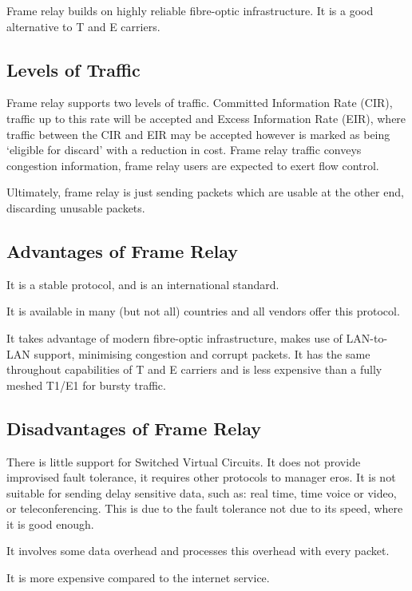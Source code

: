 Frame relay builds on highly reliable fibre-optic infrastructure. It is a good alternative to T and E carriers.
\subsection*{Levels of Traffic}
Frame relay supports two levels of traffic. Committed Information Rate (CIR), traffic up to this rate will be accepted and Excess Information Rate (EIR), where traffic between the CIR and EIR may be accepted however is marked as being `eligible for discard' with a reduction in cost. Frame relay traffic conveys congestion information, frame relay users are expected to exert flow control.

Ultimately, frame relay is just sending packets which are usable at the other end, discarding unusable packets.
\subsection*{Advantages of Frame Relay}
It is a stable protocol, and is an international standard.

It is available in many (but not all) countries and all vendors offer this protocol.

It takes advantage of modern fibre-optic infrastructure, makes use of LAN-to-LAN support, minimising congestion and corrupt packets. It has the same throughout capabilities of T and E carriers and is less expensive than a fully meshed T1/E1 for bursty traffic.

\subsection*{Disadvantages of Frame Relay}
There is little support for Switched Virtual Circuits. It does not provide improvised fault tolerance, it requires other protocols to manager eros. It is not suitable for sending delay sensitive data, such as: real time, time voice or video, or teleconferencing. This is due to the fault tolerance not due to its speed, where it is good enough.

It involves some data overhead and processes this overhead with every packet.

It is more expensive compared to the internet service.

